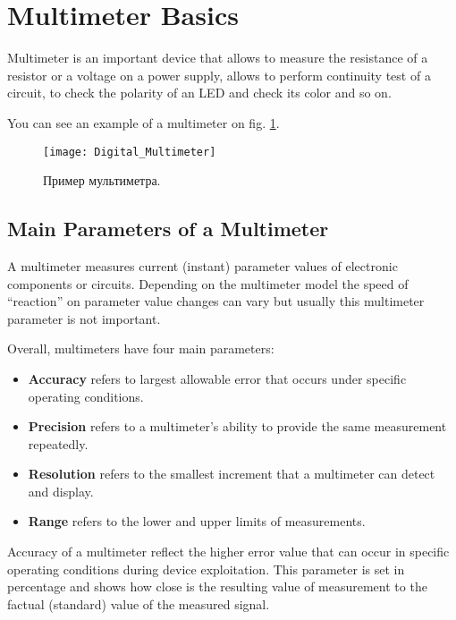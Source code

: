 \documentclass[../main.tex]{subfiles}
\begin{document}
\section{Multimeter Basics}

Multimeter is an important device that allows to measure the resistance of a
resistor or a voltage on a power supply, allows to perform continuity test of a
circuit, to check the polarity of an LED and check its color and so on.

You can see an example of a multimeter on fig. \ref{fig:multimeter-example}.

\begin{figure}[ht]
  \centering
  \texttt{[image: Digital\_Multimeter]}
  \caption{Пример мультиметра.}
  \label{fig:multimeter-example}
\end{figure}

\subsection{Main Parameters of a Multimeter}

A multimeter measures current (instant) parameter values of electronic
components or circuits.  Depending on the multimeter model the speed of
``reaction'' on parameter value changes can vary but usually this multimeter
parameter is not important.

Overall, multimeters have four\cite{fluke:multimeter} main parameters:
\begin{itemize}
\item \textbf{Accuracy} refers to largest allowable error that occurs under
  specific operating conditions.
\item \textbf{Precision} refers to a multimeter's ability to provide the same
  measurement repeatedly.
\item \textbf{Resolution} refers to the smallest increment that a multimeter can
  detect and display.
\item \textbf{Range} refers to the lower and upper limits of measurements.
\end{itemize}

Accuracy of a multimeter reflect the higher error value that can occur in
specific operating conditions during device exploitation.  This parameter is set
in percentage and shows how close is the resulting value of measurement to the
factual (standard) value of the measured signal.
\end{document}
